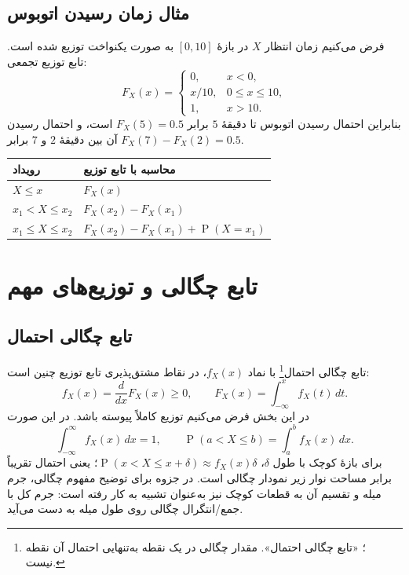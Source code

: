 \documentclass[12pt,a4paper,oneside]{book}
\newcommand{\Prob}{\operatorname{P}}
\begin{document}
\section{مثال زمان رسیدن اتوبوس}
فرض می‌کنیم زمان انتظار $X$ در بازهٔ $[0,10]$ به صورت یکنواخت توزیع شده است. تابع توزیع تجمعی:
\begin{equation}\label{eq:bus}
F_X(x)=\begin{cases}0,&x<0,\\x/10,&0\leq x\leq10,\\1,&x>10.\end{cases}
\end{equation}
بنابراین احتمال رسیدن اتوبوس تا دقیقهٔ $5$ برابر $F_X(5)=0.5$ است، و احتمال رسیدن آن بین دقیقهٔ $2$ و $7$ برابر $F_X(7)-F_X(2)=0.5$.

\begin{center}\small\begin{tabular}{p{48mm}p{84mm}}\toprule
رویداد & محاسبه با تابع توزیع \\ \midrule
$X\leq x$ & $F_X(x)$ \\
$x_1<X\leq x_2$ & $F_X(x_2)-F_X(x_1)$ \\
$x_1\leq X\leq x_2$ & $F_X(x_2)-F_X(x_1)+\Prob(X=x_1)$ \\ \bottomrule
\end{tabular}\end{center}

\chapter{تابع چگالی و توزیع‌های مهم}
\section{تابع چگالی احتمال}
تابع چگالی احتمال\footnote{؛ «تابع چگالی احتمال». مقدار چگالی در یک نقطه به‌تنهایی احتمال آن نقطه نیست.} با نماد $f_X(x)$، در نقاط مشتق‌پذیری تابع توزیع چنین است:
\begin{equation}\label{eq:pdf}
f_X(x)=\frac{d}{dx}F_X(x)\geq0,
\qquad F_X(x)=\int_{-\infty}^{x} f_X(t)\,dt.
\end{equation}
در این بخش فرض می‌کنیم توزیع کاملاً پیوسته باشد. در این صورت
\begin{equation}
\int_{-\infty}^{\infty}f_X(x)\,dx=1,
\qquad \Prob(a<X\leq b)=\int_a^b f_X(x)\,dx.
\end{equation}
برای بازهٔ کوچک با طول $\delta$، $\Prob(x<X\leq x+\delta)\approx f_X(x)\delta$؛ یعنی احتمال تقریباً برابر مساحت نوار زیر نمودار چگالی است. در جزوه برای توضیح مفهوم چگالی، جرم میله و تقسیم آن به قطعات کوچک نیز به‌عنوان تشبیه به کار رفته است: جرم کل با جمع/انتگرال چگالی روی طول میله به دست می‌آید.
\end{document}
